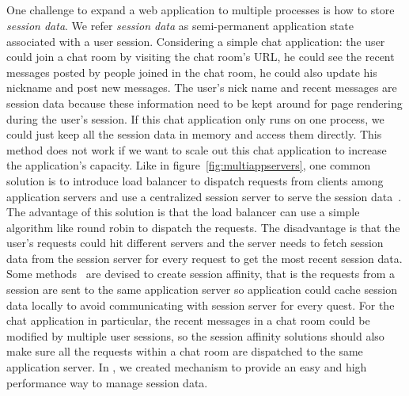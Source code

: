 \subsection{\appins{}}
\label{sec:appins}
One challenge to expand a web application to multiple processes is 
how to store \emph{session data}.
We refer \emph{session data} as semi-permanent
application state associated with a user session. 
Considering a simple chat application:
the user could join a chat room by visiting the chat room's URL,
he could see the recent messages posted by people joined in the chat room,
he could also update his nickname and post new messages.
The user's nick name and recent messages are session data
because these information need to be kept around for page rendering 
during the user's session.
If this chat application only runs on one process,
we could just keep all the session data in memory and access 
them directly.
This method does not work
if we want to scale out this chat application to increase the application's capacity.
Like in figure~\ref{fig:multiappservers}, 
one common solution is to introduce load balancer to dispatch
requests from clients among application servers and
use a centralized session server to serve the session data~\cite{j2eedoc,chlan2002internet,chiang2001transparent,saigo2003session}.
The advantage of this solution is that the load balancer can use
a simple algorithm like round robin to dispatch the requests.
The disadvantage is that the user's requests could hit different 
servers and the server needs to fetch session data from the session server
for every request to get the most recent session data.
Some methods~\cite{shachor2005maintaining} are devised to create session affinity,
that is the requests from a session are sent to the same application 
server so application could cache session data locally to avoid communicating with
session server for every quest.
For the chat application in particular, 
the recent messages in a chat room could be modified by multiple user sessions,
so the session affinity solutions should also make sure all the requests within
a chat room are dispatched to the same application server.
In \cb{}, we created \appins{} mechanism to provide an easy and high performance
way to manage session data.

\multiappservers{}

